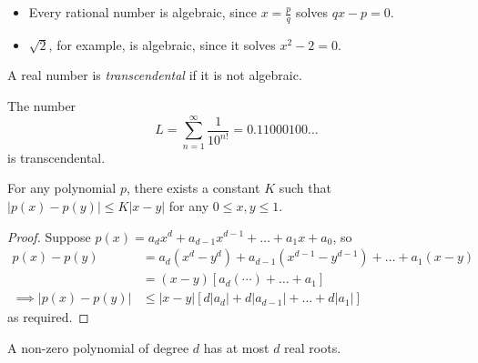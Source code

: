 \documentclass{../template/note}
\begin{document}
    \begin{example}
        \begin{itemize}
            \item Every rational number is algebraic, since \(x = \frac{p}{q}\) solves \(qx - p = 0\).
            \item \(\sqrt 2\), for example, is algebraic, since it solves \(x^2-2=0\).
        \end{itemize}
    \end{example}
    
    \begin{definition}
        A real number is \emph{transcendental} if it is not algebraic.
    \end{definition}
    
    \begin{theorem}[Liouville]
        The number
        \[
            L = \sum_{n=1}^\infty \frac{1}{10^{n!}} = 0.11000100\dots
        \]
        is transcendental.
    \end{theorem}
    
    \begin{lemma}
        For any polynomial \(p\), there exists a constant \(K\) such that \(|p(x)-p(y)| \leq K|x-y|\) for any \(0 \leq x, y \leq 1\).
        \label{liouville-lemma-1}
    \end{lemma}
    
    \begin{proof}
        Suppose \(p(x) = a_dx^d + a_{d-1}x^{d-1} + \dots + a_1 x + a_0\), so
        \begin{align*}
            p(x)-p(y) &= a_d(x^d-y^d) + a_{d-1}(x^{d-1}-y^{d-1}) + \dots + a_1(x -y) \\
            &= (x-y)[a_d(\cdots) + \dots + a_1] \\
            \implies |p(x)-p(y)| &\leq |x-y|\left[d|a_d| + d|a_{d-1}| + \dots + d|a_1|\right]
        \end{align*}
        as required.
    \end{proof}
    
    \begin{lemma}
        A non-zero polynomial of degree \(d\) has at most \(d\) real roots.
        \label{liouville-lemma-2}
    \end{lemma}

    
\end{document}
